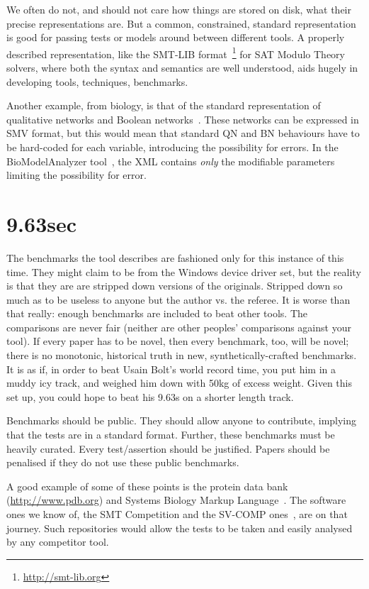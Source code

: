 \documentclass[conference]{IEEEtran}
\begin{document}
We often do not, and should not care how things are stored on disk,
what their precise representations are. But a common, constrained, standard
representation is good for passing tests or models around between
different tools. A properly described representation, like the SMT-LIB
format~\footnote{\url{http://smt-lib.org}} for SAT Modulo Theory
solvers, where both the syntax and semantics are well understood, aids
hugely in developing tools, techniques, benchmarks.

Another example, from biology, is that of the standard representation
of qualitative networks and Boolean
networks~\cite{Kauffman1969,Schaub2007}.  These networks can be
expressed in SMV format, but this would mean that standard QN and BN
behaviours have to be hard-coded for each variable, introducing the
possibility for errors. In the BioModelAnalyzer
tool~\cite{Benque2012}, the XML contains \emph{only} the modifiable
parameters limiting the possibility for error.


\section{9.63sec} 

The benchmarks the tool describes are fashioned only for this instance
of this time. They might claim to be from the Windows device driver
set, but the reality is that they are are stripped down versions of
the originals. Stripped down so much as to be useless to anyone but
the author vs. the referee. It is worse than that really: enough
benchmarks are included to beat other tools. The comparisons are never
fair (neither are other peoples' comparisons against your tool). If
every paper has to be novel, then every benchmark, too, will be novel;
there is no monotonic, historical truth in new, synthetically-crafted
benchmarks. It is as if, in order to beat Usain Bolt's world record
time, you put him in a muddy icy track, and weighed him down with 50kg
of excess weight. Given this set up, you could hope to beat his 9.63s
on a shorter length track.

Benchmarks should be public. They should allow anyone to contribute,
implying that the tests are in a standard format. Further, these
benchmarks must be heavily curated. Every test/assertion should be
justified. Papers should be penalised if they do not use these public
benchmarks.

A good example of some of these points is the protein data bank
(\url{http://www.pdb.org}) and Systems Biology Markup
Language~\cite{Hucka2003,Chaouiya2013}. The software ones we know of,
the SMT Competition and the SV-COMP ones~\cite{SMTComp2014,
  SVCOMP2015}, are on that journey. Such repositories would
allow the tests to be taken and easily analysed by any competitor
tool.
\end{document}
